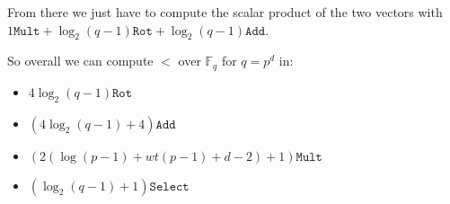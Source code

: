   From there we just have to compute the scalar product of the two vectors with $1\texttt{Mult} + \log_2(q-1)\texttt{Rot} + \log_2(q-1)\texttt{Add}$. \newline

  So overall we can compute $<$ over $\mathbb{F}_q$ for $q = p^d$ in:

  \begin{itemize}
  \item $4\log_2 (q-1) \texttt{Rot}$
  \item $(4\log_2 (q-1) + 4) \texttt{Add}$
  \item $(2(\log (p-1) + wt(p-1) + d - 2) + 1) \texttt{Mult}$
  \item $(\log_2 (q-1) + 1) \texttt{Select}$
  \end{itemize}


